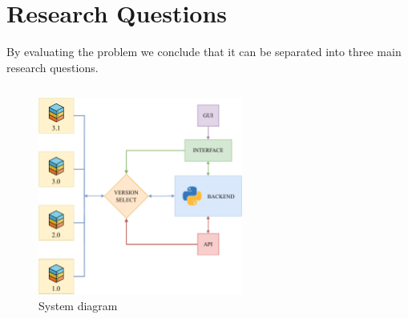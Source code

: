 \section{Research Questions} \label{sec:research-questions}

By evaluating the problem we conclude that it can be separated into three main research questions.

\begin{tabularx}{\textwidth}{lX}
    
    
    
\end{tabularx}

\begin{figure}[H]
    \centering
    \includegraphics[width=0.6\textwidth]{images/system-diagram}
    \caption{System diagram}
    \label{fig:system-diagram}
\end{figure}